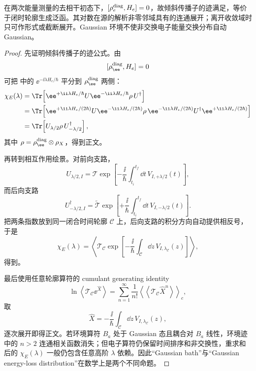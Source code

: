 \begin{proposition}[计数倾斜与轮廓连通生成函数]
在两次能量测量的去相干初态下，$[\rho_e^{\rm diag},H_e]=0$，故倾斜传播子的迹满足，等价于闭时轮廓生成泛函。其对数在源的解析非零邻域具有的连通展开；离开收敛域时只可作形式或截断展开。Gaussian 环境不使非交换电子能量交换分布自动 Gaussian。
\end{proposition}
\begin{proof}
先证明倾斜传播子的迹公式。由
\[
[\rho_\ee^{\rm diag},H_e]=0
\]
可把 中的
$\ee^{-\ii\lambda H_e/\hbar}$ 平分到 $\rho_\ee^{\rm diag}$ 两侧：
\begin{align*}
\chi_E(\lambda)
&=\Tr\!\left[
\ee^{+\ii\lambda H_e/\hbar}
U
\ee^{-\ii\lambda H_e/\hbar}
\rho\,U^\dagger
\right]\\
&=\Tr\!\left[
\ee^{+\ii\lambda H_e/(2\hbar)}
U
\ee^{-\ii\lambda H_e/(2\hbar)}
\rho\,
\ee^{-\ii\lambda H_e/(2\hbar)}
U^\dagger
\ee^{+\ii\lambda H_e/(2\hbar)}
\right]\\
&=\Tr\!\left[
U_{\lambda/2}\rho\,U_{-\lambda/2}^\dagger
\right],
\end{align*}
其中 $\rho=\rho_\ee^{\rm diag}\otimes\rho_X$，得到正文。

再转到相互作用绘景。对前向支路，
\[
U_{\lambda/2,I}
=
\mathcal T
\exp\!\left[
-\frac{\ii}{\hbar}
\int_{t_i}^{t_f}\dd t\,
V_{I,+\lambda/2}(t)
\right],
\]
而后向支路
\[
U_{-\lambda/2,I}^{\dagger}
=
\widetilde{\mathcal T}
\exp\!\left[
+\frac{\ii}{\hbar}
\int_{t_i}^{t_f}\dd t\,
V_{I,-\lambda/2}(t)
\right].
\]
把两条指数放到同一闭合时间轮廓 $\mathcal C$ 上，后向支路的积分方向自动提供相反号，于是
\[
\chi_E(\lambda)
=
\left\langle
\mathcal T_{\mathcal C}
\exp\!\left[
-\frac{\ii}{\hbar}
\int_{\mathcal C}\dd z\,
V_{I,\lambda_{\mathcal C}}(z)
\right]
\right\rangle ,
\]
得到。

最后使用任意轮廓算符的 cumulant generating identity
\[
\ln\left\langle
\mathcal T_{\mathcal C}\ee^{\hat X}
\right\rangle
=
\sum_{n=1}^{\infty}
\frac1{n!}
\left\langle\!\left\langle
\mathcal T_{\mathcal C}\hat X^n
\right\rangle\!\right\rangle_c,
\]
取
\[
\hat X
=
-\frac{\ii}{\hbar}
\int_{\mathcal C}\dd z\,
V_{I,\lambda_{\mathcal C}}(z),
\]
逐次展开即得正文。若环境算符 $B_a$ 处于 Gaussian 态且耦合对 $B_a$ 线性，环境迹中的 $n>2$ 连通相关函数消失；但电子算符仍保留时间排序和非交换性，重求和后的 $\chi_E(\lambda)$ 一般仍包含任意高阶 $\lambda$ 依赖。因此“Gaussian bath”与“Gaussian energy-loss distribution”在数学上是两个不同命题。
\end{proof}


